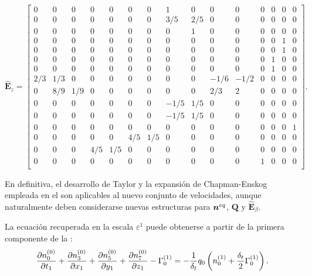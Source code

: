 \begin{equation}
	\hat{\bm{E}}_{z}=
	\begin{bmatrix}
	0 & 0 & 0 & 0 & 0 & 0 & 0 & 1 & 0 & 0 & 0 & 0 & 0 & 0 & 0 \\
	0 & 0 & 0 & 0 & 0 & 0 & 0 & 3/5 & 2/5 & 0 & 0 & 0 & 0 & 0 & 0 \\
	0 & 0 & 0 & 0 & 0 & 0 & 0 & 0 & 1 & 0 & 0 & 0 & 0 & 0 & 0 \\
	0 & 0 & 0 & 0 & 0 & 0 & 0 & 0 & 0 & 0 & 0 & 0 & 0 & 1 & 0 \\
	0 & 0 & 0 & 0 & 0 & 0 & 0 & 0 & 0 & 0 & 0 & 0 & 0 & 1 & 0 \\
	0 & 0 & 0 & 0 & 0 & 0 & 0 & 0 & 0 & 0 & 0 & 0 & 1 & 0 & 0 \\
	0 & 0 & 0 & 0 & 0 & 0 & 0 & 0 & 0 & 0 & 0 & 0 & 1 & 0 & 0 \\
	2/3 & 1/3 & 0 & 0 & 0 & 0 & 0 & 0 & 0 & -1/6 & -1/2 & 0 & 0 & 0 & 0 \\
	0 & 8/9 & 1/9 & 0 & 0 & 0 & 0 & 0 & 0 & 2/3 & 2 & 0 & 0 & 0 & 0 \\
	0 & 0 & 0 & 0 & 0 & 0 & 0 & -1/5 & 1/5 & 0 & 0 & 0 & 0 & 0 & 0 \\
	0 & 0 & 0 & 0 & 0 & 0 & 0 & -1/5 & 1/5 & 0 & 0 & 0 & 0 & 0 & 0 \\
	0 & 0 & 0 & 0 & 0 & 0 & 0 & 0 & 0 & 0 & 0 & 0 & 0 & 0 & 1 \\
	0 & 0 & 0 & 0 & 0 & 4/5 & 1/5 & 0 & 0 & 0 & 0 & 0 & 0 & 0 & 0 \\
	0 & 0 & 0 & 4/5 & 1/5 & 0 & 0 & 0 & 0 & 0 & 0 & 0 & 0 & 0 & 0 \\
	0 & 0 & 0 & 0 & 0 & 0 & 0 & 0 & 0 & 0 & 0 & 1 & 0 & 0 & 0 \\
	\end{bmatrix}.
\end{equation} 

En definitiva, el desarrollo de Taylor y la expansi\'on de Chapman-Enskog empleada en el  son aplicables al nuevo conjunto de velocidades, aunque naturalmente deben considerarse nuevas estructuras para $\bm{n}^{eq}$, $\bm{Q}$ y $\hat{\bm{E}}_{\beta}$. 

La ecuaci\'on recuperada en la escala $\varepsilon^1$ puede obtenerse a partir de la primera componente de la :
\begin{equation}
	\dfrac{\partial n_{0}^{(0)}}{\partial t_1} 
	+ \dfrac{\partial n_{3}^{(0)}}{\partial x_1}
	+ \dfrac{\partial n_{5}^{(0)}}{\partial y_1}
	+ \dfrac{\partial n_{7}^{(0)}}{\partial z_1}		
	- \Gamma_0^{(1)}
	= - \dfrac{1}{\delta_t} q_0 \left( n_{0}^{(1)} + \dfrac{\delta_t}{2} \Gamma_0^{(1)} \right).
	\label{eq:eps1_comp_3d}
\end{equation}

